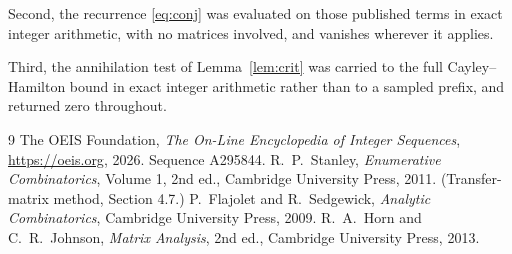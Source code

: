 \documentclass[11pt,a4paper]{article}
\theoremstyle{plain}
\theoremstyle{definition}
\begin{document}
Second, the recurrence \eqref{eq:conj} was evaluated on those published terms in exact
integer arithmetic, with no matrices involved, and vanishes wherever it applies.

Third, the annihilation test of Lemma~\ref{lem:crit} was carried to the full
Cayley--Hamilton bound in exact integer arithmetic rather than to a sampled prefix, and
returned zero throughout.

\begin{thebibliography}{9}
 The OEIS Foundation, \emph{The On-Line Encyclopedia of Integer
Sequences}, \url{https://oeis.org}, 2026. Sequence A295844.
 R.~P.~Stanley, \emph{Enumerative Combinatorics}, Volume 1, 2nd ed.,
Cambridge University Press, 2011. (Transfer-matrix method, Section 4.7.)
 P.~Flajolet and R.~Sedgewick, \emph{Analytic Combinatorics}, Cambridge
University Press, 2009.
 R.~A.~Horn and C.~R.~Johnson, \emph{Matrix Analysis}, 2nd ed., Cambridge
University Press, 2013.
\end{thebibliography}
\end{document}
